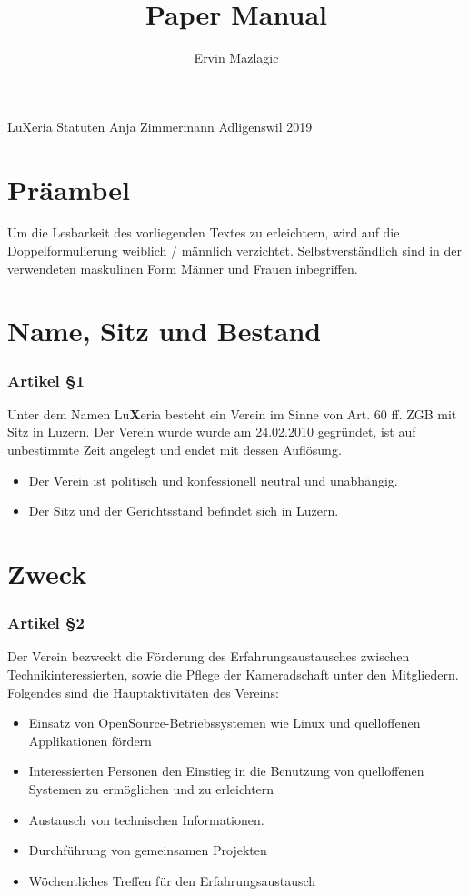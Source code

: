 \documentclass[a4paper,
               10pt,
               fleqn]{article}
\author{Ervin Mazlagic}
\title{Paper Manual}
\begin{document}
         {LuXeria Statuten}                     %
         {Anja Zimmermann}   %
         {Adligenswil}                          %
         {2019}                                 %

\tableofcontents
\newpage



\section*{Präambel}
Um die Lesbarkeit des vorliegenden Textes zu
erleichtern, wird auf die Doppelformulierung weiblich /
männlich verzichtet. Selbstverständlich sind in der
verwendeten maskulinen Form Männer und Frauen inbegriffen.

\section{Name, Sitz und Bestand}

\subsubsection*{Artikel §1}
Unter dem Namen Lu\textbf{X}eria besteht ein Verein im
Sinne von Art. 60 ff. ZGB mit Sitz in Luzern. Der
Verein wurde wurde am 24.02.2010 gegründet, ist auf
unbestimmte Zeit angelegt und endet mit dessen Auflösung.
\begin{itemize}
\item Der Verein ist politisch und konfessionell neutral 
und unabhängig.
\item Der Sitz und der Gerichtsstand befindet sich in
Luzern.
\end{itemize}

\section{Zweck}

\subsubsection*{Artikel §2}
Der Verein bezweckt die Förderung des Erfahrungsaustausches 
zwischen Technikinteressierten, sowie die Pflege der
Kameradschaft unter den Mitgliedern.\newline \newline
Folgendes sind die Hauptaktivitäten des Vereins:
\begin{itemize}
\item Einsatz von OpenSource-Betriebssystemen wie Linux und
 quelloffenen Applikationen fördern
\item Interessierten Personen den Einstieg in die Benutzung 
von quelloffenen Systemen zu ermöglichen und zu erleichtern
\item Austausch von technischen Informationen.
\item Durchführung von gemeinsamen Projekten
\item Wöchentliches Treffen für den Erfahrungsaustausch
\end{itemize}
\end{document}
